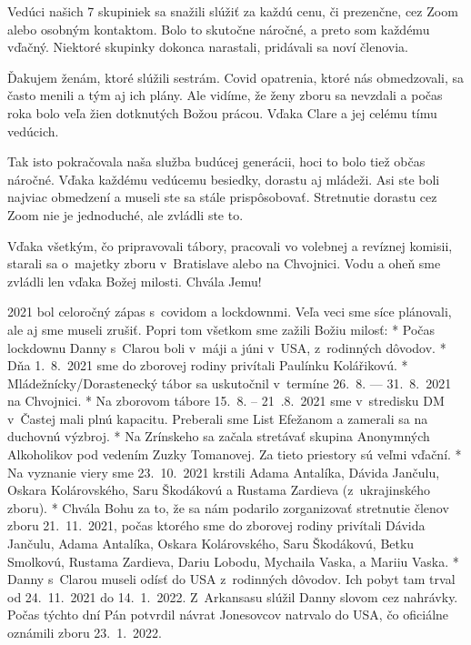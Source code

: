 Vedúci našich 7 skupiniek sa snažili slúžiť za každú cenu, či prezenčne, cez Zoom alebo osobným kontaktom. Bolo to skutočne náročné, a preto som každému vďačný. Niektoré skupinky dokonca narastali, pridávali sa noví členovia.

Ďakujem ženám, ktoré slúžili sestrám. Covid opatrenia, ktoré nás obmedzovali, sa často menili a tým aj ich plány. Ale vidíme, že ženy zboru sa nevzdali a počas roka bolo veľa žien dotknutých Božou prácou. Vďaka Clare a jej celému tímu vedúcich. 

Tak isto pokračovala naša služba budúcej generácii, hoci to bolo tiež občas náročné. Vďaka každému vedúcemu besiedky, dorastu aj mládeži. Asi ste boli najviac obmedzení a museli ste sa stále prispôsobovať. Stretnutie dorastu cez Zoom nie je jednoduché, ale zvládli ste to.

Vďaka všetkým, čo pripravovali tábory, pracovali vo volebnej a revíznej komisii, starali sa o~majetky zboru v~Bratislave alebo na Chvojnici.
Vodu a oheň sme zvládli len vďaka Božej milosti. Chvála Jemu!

2021 bol celoročný zápas s~covidom a lockdownmi. Veľa veci sme síce plánovali, ale aj sme museli zrušiť. Popri tom všetkom sme zažili Božiu milosť:
\begitems
* Počas lockdownu Danny s~Clarou boli v~máji a júni v~USA, z~rodinných dôvodov.
* Dňa 1.~8.~2021 sme do zborovej rodiny privítali Paulínku Kolářikovú. 
* Mládežnícky/Dorastenecký tábor sa uskutočnil v~termíne 26.~8. --- 31.~8.~2021 na Chvojnici. 
* Na zborovom tábore 15.~8. -- 21~.8.~2021 sme v~stredisku DM v~Častej mali plnú kapacitu. Preberali sme List Efežanom a zamerali sa na duchovnú výzbroj. 
* Na Zrínskeho sa začala stretávať skupina Anonymných Alkoholikov pod vedením Zuzky Tomanovej. Za tieto priestory sú veľmi vďační. 
* Na vyznanie viery sme 23.~10.~2021 krstili Adama Antalíka, Dávida Jančulu, Oskara Kolárovského, Saru Škodákovú a Rustama Zardieva (z~ukrajinského zboru).
* Chvála Bohu za to, že sa nám podarilo zorganizovať stretnutie členov zboru 21.~11.~2021, počas ktorého sme do zborovej rodiny privítali Dávida Jančulu, Adama Antalíka, Oskara Kolárovského, Saru Škodákovú, Betku Smolkovú, Rustama Zardieva, Dariu Lobodu, Mychaila Vaska, a Mariiu Vaska. 
* Danny s~Clarou museli odísť do USA z~rodinných dôvodov. Ich pobyt tam trval od 24.~11.~2021 do 14.~1.~2022. Z~Arkansasu slúžil Danny slovom cez nahrávky. Počas týchto dní Pán potvrdil návrat Jonesovcov natrvalo do USA, čo oficiálne oznámili zboru 23.~1.~2022.
\enditems



